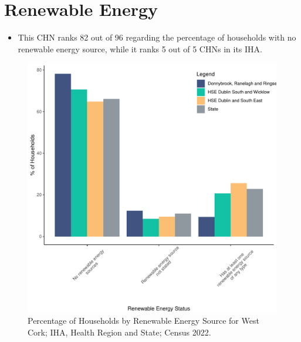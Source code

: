 \documentclass{article}
\begin{document}
\section{Renewable Energy}\label{sect:RE}
\begin{itemize}
\item This CHN ranks  82 out of 96 regarding the percentage of households with no renewable energy source, while it ranks   5 out of 5 CHNs in its IHA.
\end{itemize}
\begin{figure}[H]
	\centering
	\includegraphics[width = 140mm]{../figures/RenewableEnergyED.pdf}
	\caption{Percentage of Households by Renewable Energy Source for West Cork; IHA, Health Region and State; Census 2022.}
	\label{fig:vbnv}
	\end{figure}
\end{document}
